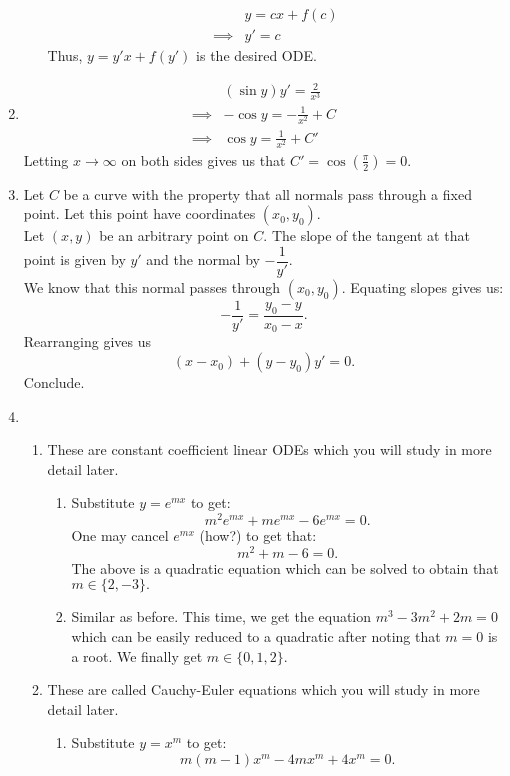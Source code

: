 \documentclass{article}
\begin{document}
\begin{enumerate}[label = Q.\arabic*.]
\begin{enumerate}[label = (\roman*)]
		\begin{align*} 
			& y = cx + f(c)\\
			\implies & y' = c
		\end{align*}
		Thus, $y = y'x + f(y')$ is the desired ODE.
	\end{enumerate}
	\item 
	\begin{align*} 
		& (\sin y)y' = \frac{2}{x^3}\\
		\implies & -\cos y = -\frac{1}{x^2} + C\\
		\implies & \cos y = \frac{1}{x^2} + C'
	\end{align*}
	Letting $x \to \infty$ on both sides gives us that $C' = \cos\left(\frac{\pi}{2}\right) = 0.$
	\item Let $C$ be a curve with the property that all normals pass through a fixed point. Let this point have coordinates $(x_0, y_0).$\\
	Let $(x, y)$ be an arbitrary point on $C.$ The slope of the tangent at that point is given by $y'$ and the normal by $-\dfrac{1}{y'}.$\\
	We know that this normal passes through $(x_0, y_0).$ Equating slopes gives us:
	\[-\dfrac{1}{y'} = \dfrac{y_0 - y}{x_0 - x}.\]
	Rearranging gives us
	\[(x - x_0) + (y - y_0)y' = 0.\]
	Conclude.
	\item 
	\begin{enumerate}[label = (\alph*)] 
		\item These are constant coefficient linear ODEs which you will study in more detail later.
		\begin{enumerate}[label = (\roman*)] 
			\item Substitute $y = e^{mx}$ to get:
			\[m^2e^{mx} + me^{mx} - 6e^{mx} = 0.\]
			One may cancel $e^{mx}$ (how?) to get that:
			\[m^2 + m - 6 = 0.\]
			The above is a quadratic equation which can be solved to obtain that $m \in \{2, -3\}.$
			\item Similar as before. This time, we get the equation $m^3 - 3m^2 + 2m = 0$ which can be easily reduced to a quadratic after noting that $m = 0$ is a root. We finally get $m \in \{0, 1, 2\}.$
		\end{enumerate}	
		\item These are called Cauchy-Euler equations which you will study in more detail later.
		\begin{enumerate}[label = (\roman*)] 
			\item Substitute $y = x^m$ to get:
			\[m(m - 1)x^{m} - 4mx^{m} + 4x^{m} = 0.\]

\end{enumerate}
\end{enumerate}
\end{enumerate}
\end{document}

